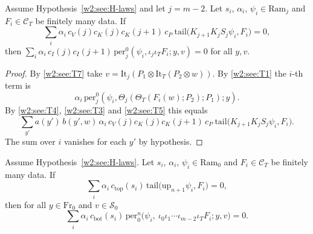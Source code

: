 \begin{proposition}\label{w2:see:last}
Assume Hypothesis~\ref{w2:see:H-laws} and let $j=m-2$. Let $s_i$, $\alpha_i$, $\psi_i\in\mathrm{Ram}_j$ and $F_i\in\mathcal C_T$ be finitely many data. If
\[
\sum_i\alpha_i\,c_V(j)c_K(j)c_K(j+1)\,c_P\ \mathrm{tail}\bigl(K_{j+1}K_jS_j\psi_i,F_i\bigr)=0,
\]
then $\sum_i\alpha_i\,c_I(j)c_I(j+1)\,\mathrm{per}^0_j(\psi_i,\iota_j\iota_TF_i;y,v)=0$ for all $y,v$.
\end{proposition}

\begin{proof}
By \ref{w2:see:T7} take $v=\mathrm{It}_j(P_1\otimes\mathrm{It}_T(P_2\otimes w))$. By \ref{w2:see:T1} the $i$-th term is
\[
 \alpha_i\,\mathrm{per}^0_j(\psi_i,\Theta_j(\Theta_T(F_i(w);P_2);P_1);y).
\]
By \ref{w2:see:T4}, \ref{w2:see:T3} and \ref{w2:see:T5} this equals
\[
\sum_{y'}a(y')\,b(y',w)\,\alpha_i\,c_V(j)c_K(j)c_K(j+1)\,c_P\ \mathrm{tail}\bigl(K_{j+1}K_jS_j\psi_i,F_i\bigr).
\]
The sum over $i$ vanishes for each $y'$ by hypothesis.
\end{proof}

\begin{theorem}\label{w2:see:main}
Assume Hypothesis~\ref{w2:see:H-laws}. Let $s_i$, $\alpha_i$, $\psi_i\in\mathrm{Ram}_0$ and $F_i\in\mathcal C_T$ be finitely many data. If
\[
\sum_i\alpha_i\,c_{\mathrm{top}}(s_i)\,\mathrm{tail}\bigl(\mathrm{up}_{n+1}\psi_i,F_i\bigr)=0,
\]
then for all $y\in\mathrm{Fr}_0$ and $v\in\mathcal S_0$
\[
\sum_i\alpha_i\,c_{\mathrm{bot}}(s_i)\,\mathrm{per}^n_0\bigl(\psi_i,\ \iota_0\iota_1\cdots\iota_{m-2}\iota_TF_i;y,v\bigr)=0 .
\]
\end{theorem}

